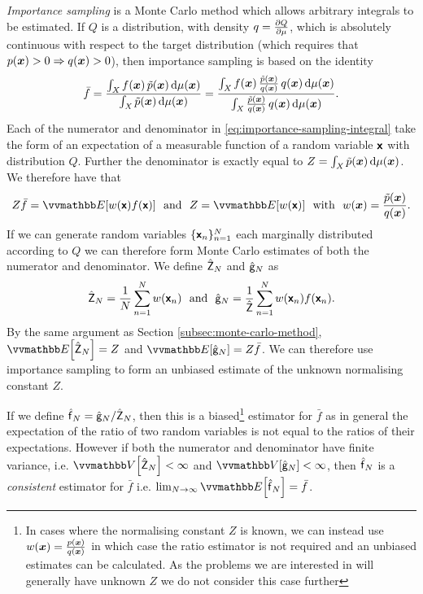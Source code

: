 \emph{Importance sampling} \citep{kahn1951estimation} is a Monte Carlo method which allows arbitrary integrals to be estimated. If $Q$ is a distribution, with density $q = \frac{\partial Q}{\partial \mu}$, which is absolutely continuous with respect to the target distribution (which requires that $p(\boldsymbol{x}) > 0 \Rightarrow q(\boldsymbol{x}) > 0$), then importance sampling is based on the identity
\begin{equation}\label{eq:importance-sampling-integral}
  \bar{f} =
  \frac
  {\int_{\mathit{X}} f(\boldsymbol{x}) \,\tilde{p}(\boldsymbol{x}) \,\mathrm{d}\mu(\boldsymbol{x})}
  {\int_{\mathit{X}} \tilde{p}(\boldsymbol{x}) \,\mathrm{d}\mu(\boldsymbol{x})}
  =
  \frac
  {\int_{\mathit{X}} f(\boldsymbol{x}) \,\frac{\tilde{p}(\boldsymbol{x})}{q(\boldsymbol{x})} \, q(\boldsymbol{x}) \,\mathrm{d}\mu(\boldsymbol{x})}
  {\int_{\mathit{X}} \frac{\tilde{p}(\boldsymbol{x})}{q(\boldsymbol{x})} \, q(\boldsymbol{x}) \,\mathrm{d}\mu(\boldsymbol{x})}.
\end{equation}
Each of the numerator and denominator in \eqref{eq:importance-sampling-integral} take the form of an expectation of a measurable function of a random variable $\boldsymbol{\mathsf{x}}$ with distribution $Q$. Further the denominator is exactly equal to $Z = \int_{\mathit{X}}\tilde{p}(\boldsymbol{x})\,\mathrm{d}\mu(\boldsymbol{x})$. We therefore have that
\begin{equation}\label{eq:importance-sampling-expectations}
  Z \bar{f} = \expc{w(\rvct{x}) f(\rvct{x})}
  ~~\textrm{and}~~
  Z = \expc{w(\rvct{x})}
  ~~\textrm{with}~~
  w(\vct{x}) = \frac{\utgtdens(\vct{x})}{q(\vct{x})}.
\end{equation}
If we can generate random variables $\lbrace \boldsymbol{\mathsf{x}}_n \rbrace_{n=1}^N$ each marginally distributed according to $Q$ we can therefore form Monte Carlo estimates of both the numerator and denominator. We define $\hat{\mathsf{Z}}_N$ and $\hat{\mathsf{g}}_N$ as
\begin{equation}\label{eq:importance-sampling-mc-estimates}
  \hat{\rvar{Z}}_N = \frac{1}{N} \sum_{n=1}^N w\lpa\rvct{x}_n\rpa
  ~~\textrm{and}~~
  \hat{\rvar{g}}_N = \frac{1}{\hat{\rvar{Z}}} \sum_{n=1}^N w\lpa\rvct{x}_n\rpa f\lpa\rvct{x}_n\rpa.
\end{equation}
By the same argument as Section \ref{subsec:monte-carlo-method}, $\expc{\hat{\rvar{Z}}_N} = Z$ and $\expc{\hat{\rvar{g}}_N} = Z\bar{f}$. We can therefore use importance sampling to form an unbiased estimate of the unknown normalising constant $Z$. 

If we define $\hatf_N = \hat{\rvar{g}}_N / \hat{\rvar{Z}}_N$, then this is a biased\footnote{In cases where the normalising constant $Z$ is known, we can instead use $w(\boldsymbol{x}) = \frac{p(\boldsymbol{x})}{q(\boldsymbol{x})}$ in which case the ratio estimator is not required and an unbiased estimates can be calculated. As the problems we are interested in will generally have unknown $Z$ we do not consider this case further} estimator for $\bar{f}$ as in general the expectation of the ratio of two random variables is not equal to the ratios of their expectations. However if both the numerator and denominator have finite variance, i.e. $\var{\hat{\rvar{Z}}_N} < \infty$ and $\var{\hat{\rvar{g}}_N} < \infty$, then $\hatf_N$ is a \emph{consistent} estimator for $\bar{f}$ i.e. $\lim_{N\to\infty} \expc{\hatf_N} = \bar{f}$.

